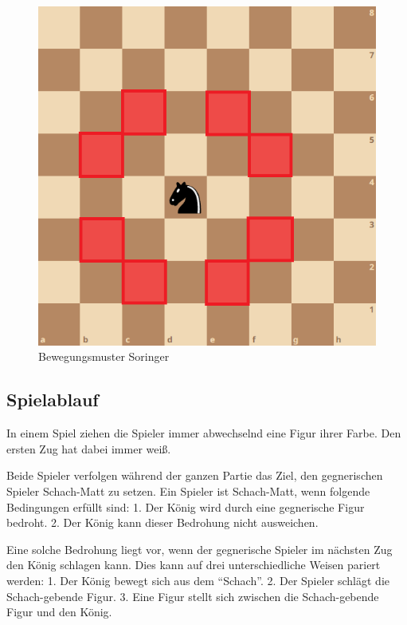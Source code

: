 \documentclass[a4paper,12pt]{article}
\begin{document}
\begin{itemize}
		\begin{figure}
			\centering
			\includegraphics{../Abbildungen/Springer.png} 
			\caption{Bewegungsmuster Soringer}
		\end{figure}
\end{itemize}


    \hypertarget{spielablauf}{%
\subsection{Spielablauf}\label{spielablauf}}

    In einem Spiel ziehen die Spieler immer abwechselnd eine Figur ihrer
Farbe. Den ersten Zug hat dabei immer weiß.

Beide Spieler verfolgen während der ganzen Partie das Ziel, den
gegnerischen Spieler Schach-Matt zu setzen. Ein Spieler ist Schach-Matt,
wenn folgende Bedingungen erfüllt sind: 1. Der König wird durch eine
gegnerische Figur bedroht. 2. Der König kann dieser Bedrohung nicht
ausweichen.

Eine solche Bedrohung liegt vor, wenn der gegnerische Spieler im
nächsten Zug den König schlagen kann. Dies kann auf drei
unterschiedliche Weisen pariert werden: 1. Der König bewegt sich aus dem
``Schach''. 2. Der Spieler schlägt die Schach-gebende Figur. 3. Eine
Figur stellt sich zwischen die Schach-gebende Figur und den König.
\end{document}
